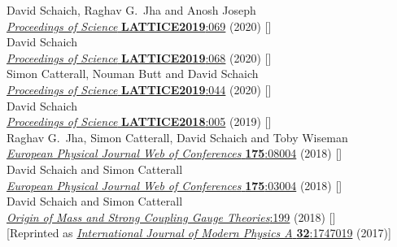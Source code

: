 \begin{spacelist}
\begin{revnumerate}
      David Schaich, Raghav G.~Jha and Anosh Joseph \\
      \href{https://doi.org/10.22323/1.363.0069}{\textit{Proceedings of Science} \textbf{LATTICE2019}:069} (2020) []
    \pagebreakitem
       \\
      David Schaich \\
      \href{https://doi.org/10.22323/1.363.0068}{\textit{Proceedings of Science} \textbf{LATTICE2019}:068} (2020) []
    \pagebreakitem
       \\
      Simon Catterall, Nouman Butt and David Schaich \\
      \href{https://doi.org/10.22323/1.363.0044}{\textit{Proceedings of Science} \textbf{LATTICE2019}:044} (2020) []
    \pagebreakitem
       \\
      David Schaich \\
      \href{https://doi.org/10.22323/1.334.0005}{\textit{Proceedings of Science} \textbf{LATTICE2018}:005} (2019) []
    \pagebreakitem
       \\
      Raghav G.~Jha, Simon Catterall, David Schaich and Toby Wiseman \\
      \href{https://doi.org/10.1051/epjconf/201817508004}{\textit{European Physical Journal Web of Conferences} \textbf{175}:08004} (2018) []
    \pagebreakitem
       \\
      David Schaich and Simon Catterall \\
      \href{https://doi.org/10.1051/epjconf/201817503004}{\textit{European Physical Journal Web of Conferences} \textbf{175}:03004} (2018) []
    \pagebreakitem
       \\
      David Schaich and Simon Catterall \\
      \href{https://doi.org/10.1142/9789813231467_0028}{\textit{Origin of Mass and Strong Coupling Gauge Theories}:199} (2018) [] \\
      {[Reprinted as \href{https://doi.org/10.1142/S0217751X17470194}{\textit{International Journal of Modern Physics A} \textbf{32}:1747019} (2017)]}
    \pagebreakitem
       \\

\end{revnumerate}
\end{spacelist}
